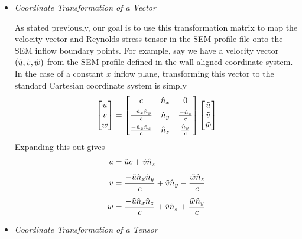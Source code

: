 \begin{itemize}[parsep=2.5\parsep]

\item \textit{Coordinate Transformation of a Vector}

    As stated previously, our goal is to use this transformation matrix to map
    the velocity vector and Reynolds stress tensor in the SEM profile file onto
    the SEM inflow boundary points.
    For example, say we have a velocity vector \((\tilde{u},\tilde{v},\tilde{w})\)
    from the SEM profile defined in the wall-aligned coordinate system.
    In the case of a constant $x$ inflow plane,
    transforming this vector to the standard Cartesian coordinate system is
    simply
    \begin{equation*}
      \begin{bmatrix}
        u \\ v \\ w
      \end{bmatrix} =
      \begin{bmatrix}
        c                 & \hat{n}_x & 0 \\[1.0ex]
        \frac{-\hat{n}_x\hat{n}_y}{c} & \hat{n}_y & \frac{-\hat{n}_z}{c} \\[1.0ex]
        \frac{-\hat{n}_x\hat{n}_z}{c} & \hat{n}_z & \frac{ \hat{n}_y}{c}
      \end{bmatrix}
      \begin{bmatrix}
        \tilde{u} \\ \tilde{v} \\ \tilde{w}
      \end{bmatrix}
    \end{equation*}
    Expanding this out gives
    \begin{align*}
      u & =        \tilde{u}        c +\tilde{v}\hat{n}_x \\[1.0ex]
      v & = \frac{-\tilde{u}\hat{n}_x\hat{n}_y}{c}+\tilde{v}\hat{n}_y-\frac{\tilde{w}\hat{n}_z}{c} \\[1.0ex]
      w & = \frac{-\tilde{u}\hat{n}_x\hat{n}_z}{c}+\tilde{v}\hat{n}_z+\frac{\tilde{w}\hat{n}_y}{c}
    \end{align*}


\item \textit{Coordinate Transformation of a Tensor}


\end{itemize}
